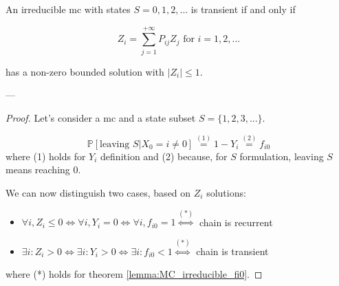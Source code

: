 	\begin{theorem}
		An irreducible \gls{mc} with states $S = 0, 1, 2, ...$ is transient if and only if

		$$ Z_i = \sum_{j=1}^{+\infty} P_{ij} Z_j \text{ for } i = 1, 2, ...$$

		has a non-zero bounded solution with $ |Z_i| \le 1$.
	\end{theorem}
	---
	\begin{proof}
		Let's consider a \gls{mc} and a state subset $S = \{1, 2, 3, ...\}$.

		$$ \mathbb{P}[\text{leaving } S| X_0 = i \neq 0] \stackrel{(1)}{=}
			1 - Y_i \stackrel{(2)}{=} f_{i0} $$
		where (1) holds for $Y_i$ definition and (2) because, for $S$ formulation, leaving $S$ means reaching 0.

		We can now distinguish two cases, based on $Z_i$ solutions:
		\begin{itemize}
			\item $ \forall i, Z_i \le 0 \Leftrightarrow \forall i, Y_i = 0 \Leftrightarrow \forall i, f_{i0} = 1 \stackrel{(*)}{\Leftrightarrow} $ chain is recurrent

			\item $ \exists i: Z_i > 0 \Leftrightarrow \exists i: Y_i > 0 \Leftrightarrow \exists i: f_{i0} < 1 \stackrel{(*)}{\Leftrightarrow} $ chain is transient
		\end{itemize}
		where (*) holds for theorem \ref{lemma:MC_irreducible_fi0}.
	\end{proof}

